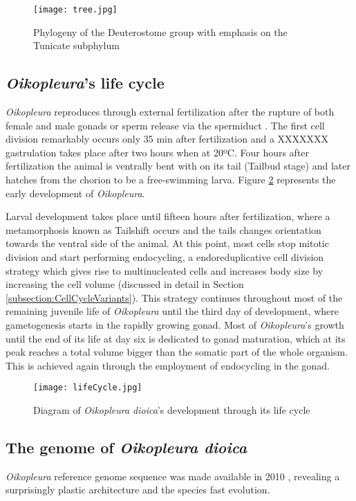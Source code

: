 \documentclass[11pt,twoside,a4paper]{report}
\begin{document}
		\begin{figure}[here]
			\centering
			\texttt{[image: tree.jpg]}
			\caption{Phylogeny of the Deuterostome group with emphasis on the Tunicate subphylum}
			\label{fig:tree}
		\end{figure}
		
		\subsection{	\textit{Oikopleura}'s life cycle}
		\textit{Oikopleura} reproduces through external fertilization after the rupture of both female and male gonads or sperm release via the spermiduct \cite{}. The first cell division remarkably occurs only 35 min after fertilization and a XXXXXXX gastrulation takes place after two hours when at 20ºC. Four hours after fertilization the animal is ventrally bent with on its tail (Tailbud stage) and later hatches from the chorion to be a free-swimming larva. Figure \ref{fig:LifeCycle} represents the early development of \textit{Oikopleura}.
		
		Larval development takes place until fifteen hours after fertilization, where a metamorphosis known as Tailshift occurs and the tails changes orientation towards the ventral side of the animal. At this point, most cells stop mitotic division and start performing endocycling, a endoreduplicative cell division strategy which gives rise to multinucleated cells and increases body size by increasing the cell volume (discussed in detail in Section \ref{subsection:CellCycleVariants}). This strategy continues throughout most of the remaining juvenile life of \textit{Oikopleura} until the third day of development, where gametogenesis starts in the rapidly growing gonad. Most of \textit{Oikopleura}'s growth until the end of its life at day six is dedicated to gonad maturation, which at its peak reaches a total volume bigger than the somatic part of the whole organism. This is achieved again through the employment of endocycling in the gonad.
		
		\begin{figure}[here]
			\centering
			\texttt{[image: lifeCycle.jpg]}
			\caption{Diagram of \textit{Oikopleura dioica}'s development through its life cycle}
			\label{fig:LifeCycle}
		\end{figure}
		

		\subsection{The genome of \textit{Oikopleura dioica}}
		\textit{Oikopleura} reference genome sequence was made available in 2010 \cite{}, revealing a surprisingly plastic architecture and the species fast evolution.
\end{document}
